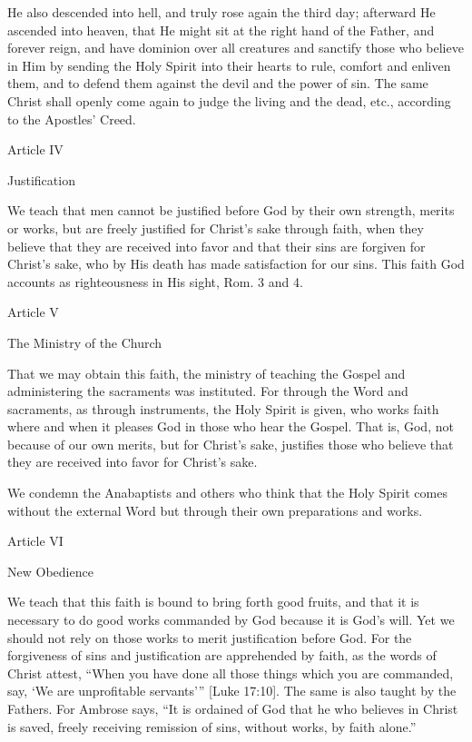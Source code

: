 He also descended into hell, and truly rose again the third day; afterward He ascended into heaven, that He might sit at the right hand of the Father, and forever reign, and have dominion over all creatures and sanctify those who believe in Him by sending the Holy Spirit into their hearts to rule, comfort and enliven them, and to defend them against the devil and the power of sin. The same Christ shall openly come again to judge the living and the dead, etc., according to the Apostles’ Creed.

 

Article IV

Justification

We teach that men cannot be justified before God by their own strength, merits or works, but are freely justified for Christ’s sake through faith, when they believe that they are received into favor and that their sins are forgiven for Christ’s sake, who by His death has made satisfaction for our sins. This faith God accounts as righteousness in His sight, Rom. 3 and 4.

 

Article V

The Ministry of the Church

That we may obtain this faith, the ministry of teaching the Gospel and administering the sacraments was instituted. For through the Word and sacraments, as through instruments, the Holy Spirit is given, who works faith where and when it pleases God in those who hear the Gospel. That is, God, not because of our own merits, but for Christ’s sake, justifies those who believe that they are received into favor for Christ’s sake.

We condemn the Anabaptists and others who think that the Holy Spirit comes without the external Word but through their own preparations and works.

 

Article VI

New Obedience

We teach that this faith is bound to bring forth good fruits, and that it is necessary to do good works commanded by God because it is God’s will. Yet we should not rely on those works to merit justification before God. For the forgiveness of sins and justification are apprehended by faith, as the words of Christ attest, “When you have done all those things which you are commanded, say, ‘We are unprofitable servants’” [Luke 17:10]. The same is also taught by the Fathers. For Ambrose says, “It is ordained of God that he who believes in Christ is saved, freely receiving remission of sins, without works, by faith alone.”

